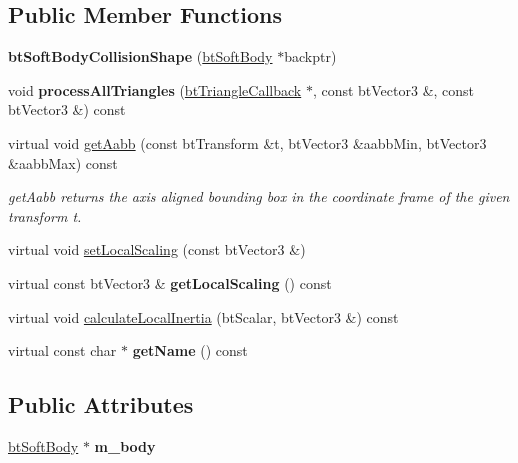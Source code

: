 \subsection*{Public Member Functions}
\begin{DoxyCompactItemize}
\item 
\mbox{\label{classbtSoftBodyCollisionShape_ac631f6b0a0d24af1afbcf7e823f5f631}} 
{\bfseries bt\+Soft\+Body\+Collision\+Shape} (\hyperlink{classbtSoftBody}{bt\+Soft\+Body} $\ast$backptr)
\item 
\mbox{\label{classbtSoftBodyCollisionShape_a2bb557b24e4325f8fcd091f2dd12e5f2}} 
void {\bfseries process\+All\+Triangles} (\hyperlink{classbtTriangleCallback}{bt\+Triangle\+Callback} $\ast$, const bt\+Vector3 \&, const bt\+Vector3 \&) const
\item 
\mbox{\label{classbtSoftBodyCollisionShape_ade8898813d2d07ad30c26eab3b7a41fc}} 
virtual void \hyperlink{classbtSoftBodyCollisionShape_ade8898813d2d07ad30c26eab3b7a41fc}{get\+Aabb} (const bt\+Transform \&t, bt\+Vector3 \&aabb\+Min, bt\+Vector3 \&aabb\+Max) const
\begin{DoxyCompactList}\small\item\em get\+Aabb returns the axis aligned bounding box in the coordinate frame of the given transform t. \end{DoxyCompactList}\item 
virtual void \hyperlink{classbtSoftBodyCollisionShape_a4458e1135af76b7ddbaa4befe0bfbc7a}{set\+Local\+Scaling} (const bt\+Vector3 \&)
\item 
\mbox{\label{classbtSoftBodyCollisionShape_ac7986002213b393887b9de42854eec76}} 
virtual const bt\+Vector3 \& {\bfseries get\+Local\+Scaling} () const
\item 
virtual void \hyperlink{classbtSoftBodyCollisionShape_a03573ba1bcb8f6599493f80a7f0aae1e}{calculate\+Local\+Inertia} (bt\+Scalar, bt\+Vector3 \&) const
\item 
\mbox{\label{classbtSoftBodyCollisionShape_ac201c7d811754d66a60cf1d11a83e295}} 
virtual const char $\ast$ {\bfseries get\+Name} () const
\end{DoxyCompactItemize}
\subsection*{Public Attributes}
\begin{DoxyCompactItemize}
\item 
\mbox{\label{classbtSoftBodyCollisionShape_a7f58131249a8200aaa86a569572ef4c2}} 
\hyperlink{classbtSoftBody}{bt\+Soft\+Body} $\ast$ {\bfseries m\+\_\+body}
\end{DoxyCompactItemize}


